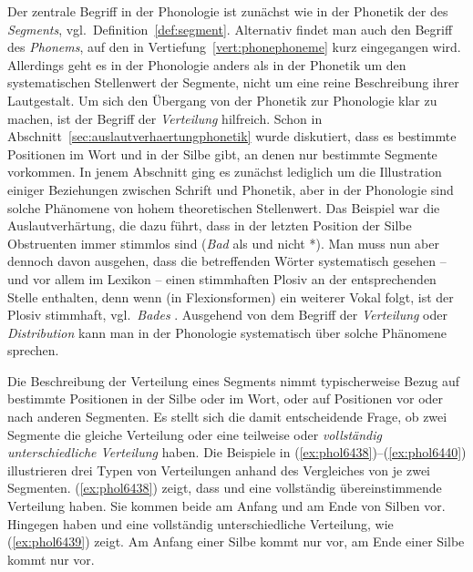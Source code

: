Der zentrale Begriff in der Phonologie ist zunächst wie in der Phonetik der des \textit{Segments}, vgl.\ Definition~\ref{def:segment}.
Alternativ findet man auch den Begriff des \textit{Phonems}, auf den in Vertiefung~\ref{vert:phonephoneme} kurz eingegangen wird.
Allerdings geht es in der Phonologie anders als in der Phonetik um den systematischen Stellenwert der Segmente, nicht um eine reine Beschreibung ihrer Lautgestalt.
Um sich den Übergang von der Phonetik zur Phonologie klar zu machen, ist der Begriff der \textit{Verteilung} hilfreich.
Schon in Abschnitt~\ref{sec:auslautverhaertungphonetik} wurde diskutiert, dass es bestimmte Positionen im Wort und in der Silbe gibt, an denen nur bestimmte Segmente vorkommen.
In jenem Abschnitt ging es zunächst lediglich um die Illustration einiger Beziehungen zwischen Schrift und Phonetik, aber in der Phonologie sind solche Phänomene von hohem theoretischen Stellenwert.
Das Beispiel war die Auslautverhärtung, die dazu führt, dass in der letzten Position der Silbe Obstruenten immer stimmlos sind (\textit{Bad} als \textipa{[ba:t]} und nicht *\textipa{[ba:d]}).
Man muss nun aber dennoch davon ausgehen, dass die betreffenden Wörter systematisch gesehen -- und vor allem im Lexikon -- einen stimmhaften Plosiv an der entsprechenden Stelle enthalten, denn wenn (\zB in Flexionsformen) ein weiterer Vokal folgt, ist der Plosiv stimmhaft, vgl.\ \textit{Bades} .
Ausgehend von dem Begriff der \textit{Verteilung} oder \textit{Distribution} kann man in der Phonologie systematisch über solche Phänomene sprechen.


Die Beschreibung der Verteilung eines Segments nimmt typischerweise Bezug auf bestimmte Positionen in der Silbe oder im Wort, oder auf Positionen vor oder nach anderen Segmenten.
Es stellt sich die damit entscheidende Frage, ob zwei Segmente die gleiche Verteilung oder eine teilweise oder \textit{vollständig unterschiedliche Verteilung} haben.
Die Beispiele in (\ref{ex:phol6438})--(\ref{ex:phol6440}) illustrieren drei Typen von Verteilungen anhand des Vergleiches von je zwei Segmenten.
(\ref{ex:phol6438}) zeigt, dass \textipa{[t]} und \textipa{[k]} eine vollständig übereinstimmende Verteilung haben.
Sie kommen beide am Anfang und am Ende von Silben vor.
Hingegen haben \textipa{[h]} und \textipa{[N]} eine vollständig unterschiedliche  Verteilung, wie (\ref{ex:phol6439}) zeigt.
Am Anfang einer Silbe kommt nur \textipa{[h]} vor, am Ende einer Silbe kommt nur \textipa{[N]} vor.

